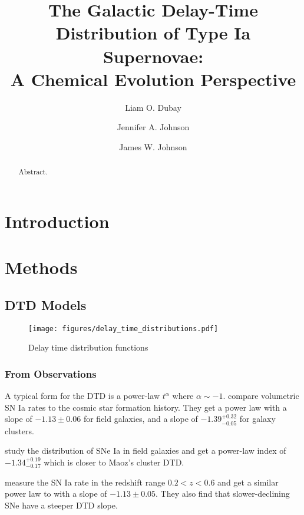 \documentclass[twocolumn]{aastex631}
\begin{document}
\title{The Galactic Delay-Time Distribution of Type Ia Supernovae:\\
    A Chemical Evolution Perspective}

\author[0000-0003-3781-0747]{Liam O. Dubay}
\author[0000-0001-7258-1834]{Jennifer A. Johnson}
\author[0000-0002-6534-8783]{James W. Johnson}

\begin{abstract}
    Abstract.
\end{abstract}

\section{Introduction}

\section{Methods}
\label{sec:methods}

\subsection{DTD Models}
\label{sec:dtd-models}

\begin{figure}
    \centering
    \texttt{[image: figures/delay\_time\_distributions.pdf]}
    \caption{Delay time distribution functions}
    \label{fig:dtds}
\end{figure}

\subsubsection{From Observations}

\citet{Maoz2014-Review}

A typical form for the DTD is a power-law $t^\alpha$ where $\alpha\sim-1$. \citet{Maoz2017-CosmicDTD} compare volumetric SN Ia rates to the cosmic star formation history. They get a power law with a slope of $-1.13\pm 0.06$ for field galaxies, and a slope of $-1.39^{+0.32}_{-0.05}$ for galaxy clusters.

\citet{Heringer2019-FieldGalaxyDTD} study the distribution of SNe Ia in field galaxies and get a power-law index of $-1.34^{+0.19}_{-0.17}$ which is closer to Maoz's cluster DTD.

\citet{Wiseman2021-DESRates} measure the SN Ia rate in the redshift range $0.2 < z < 0.6$ and get a similar power law to \citet{Maoz2017-CosmicDTD} with a slope of $-1.13 \pm 0.05$. They also find that slower-declining SNe have a steeper DTD slope.
\end{document}
